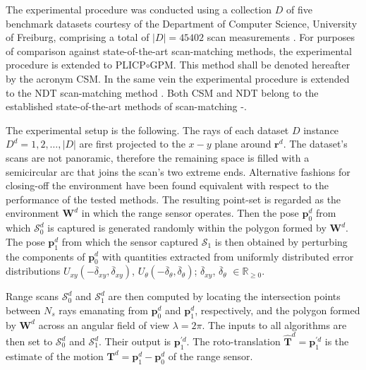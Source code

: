 The experimental procedure was conducted using a collection $D$ of five
benchmark datasets courtesy of the Department of Computer Science, University
of Freiburg, comprising a total of $|D| = 45402$ scan measurements
\cite{dataset_link}.  For purposes of comparison against state-of-the-art
scan-matching methods, the experimental procedure is extended to
PLICP$\circ$GPM. This method shall be denoted hereafter by the acronym CSM. In
the same vein the experimental procedure is extended to the NDT scan-matching
method \cite{ndt1}.  Both CSM and NDT belong to the established
state-of-the-art methods of scan-matching \cite{sota_leg_1}-\cite{sota_leg_5}.

The experimental setup is the following. The rays of each dataset $D$ instance
$D^d = 1,2,\dots,|D|$ are first projected to the $x-y$ plane around $\bm{r}^d$.
The dataset's scans are not panoramic, therefore the remaining space is filled
with a semicircular arc that joins the scan's two extreme ends. Alternative
fashions for closing-off the environment have been found equivalent with
respect to the performance of the tested methods. The resulting point-set is
regarded as the environment $\bm{W}^d$ in which the range sensor operates. Then
the pose $\bm{p}_0^d$ from which $\mathcal{S}_0^d$ is captured is generated
randomly within the polygon formed by $\bm{W}^d$. The pose $\bm{p}_1^d$ from
which the sensor captured $\mathcal{S}_1$ is then obtained by perturbing the
components of $\bm{p}_0^d$ with quantities extracted from uniformly distributed
error distributions $U_{xy}(-\overline{\delta}_{xy}, \overline{\delta}_{xy})$,
$U_{\theta}(-\overline{\delta}_{\theta}, \overline{\delta}_{\theta})$;
$\overline{\delta}_{xy}$, $\overline{\delta}_\theta$ $\in \mathbb{R}_{\geq 0}$.

Range scans $\mathcal{S}_0^d$ and $\mathcal{S}_1^d$ are then computed by
locating the intersection points between $N_s$ rays emanating from $\bm{p}_0^d$
and $\bm{p}_1^d$, respectively, and the polygon formed by $\bm{W}^d$ across an
angular field of view $\lambda = 2\pi$. The inputs to all algorithms are
then set to $\mathcal{S}_0^d$ and $\mathcal{S}_1^d$. Their output is
$\bm{p}_1^{\prime d}$. The roto-translation
$\hat{\bm{T}}^d = \bm{p}_1^{\prime d}$ is the estimate of the motion
$\bm{T}^d = \bm{p}_1^d - \bm{p}_0^d$ of the range sensor.



